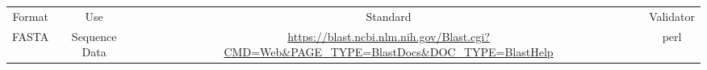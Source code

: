 \begin{tabular}{cccc}
{Format} & {Use} & {Standard} & {Validator} \\
FASTA & Sequence Data & \url{https://blast.ncbi.nlm.nih.gov/Blast.cgi?CMD=Web&PAGE_TYPE=BlastDocs&DOC_TYPE=BlastHelp} & perl
\end{tabular}